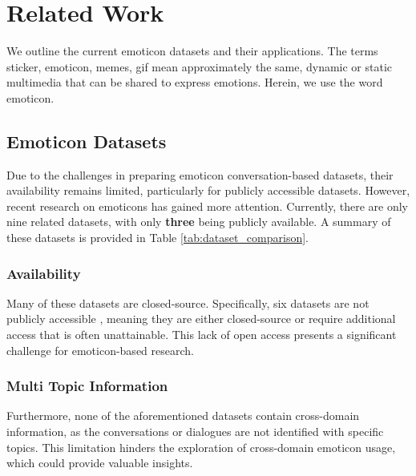 \section{Related Work}
\label{sec:related_work}
We outline the current emoticon datasets and their applications. The terms sticker, emoticon, memes, gif mean approximately the same, dynamic or static multimedia that can be shared to express emotions. Herein, we use the word emoticon.

\subsection{Emoticon Datasets}
Due to the challenges in preparing emoticon conversation-based datasets, their availability remains limited, particularly for publicly accessible datasets. However, recent research on emoticons has gained more attention. Currently, there are only nine related datasets, with only \textbf{three} being publicly available. A summary of these datasets is provided in Table \ref{tab:dataset_comparison}.

\subsubsection{Availability}
Many of these datasets are closed-source. Specifically, six datasets are not publicly accessible \cite{stickertag, stickerint, stickerclip, CSMSA, learning-to-respond-2021, chee2024persrv}, meaning they are either closed-source or require additional access that is often unattainable. This lack of open access presents a significant challenge for emoticon-based research.

\subsubsection{Multi Topic Information}
Furthermore, none of the aforementioned datasets contain cross-domain information, as the conversations or dialogues are not identified with specific topics. This limitation hinders the exploration of cross-domain emoticon usage, which could provide valuable insights.

